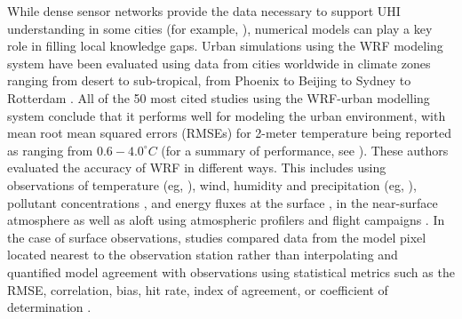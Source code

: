 \documentclass[draft,linenumbers]{agujournal}
\begin{document}
While dense sensor networks provide the data necessary to support UHI understanding in some cities (for example, \cite{scott2017intraurban,scott2017temperature,madisonUHI,minneapolisUHI,tokyoUHI}), numerical models can play a key role in filling local knowledge gaps. Urban simulations using the WRF modeling system \citep{chen2011integrated} have been evaluated using data from cities worldwide in climate zones ranging from desert to sub-tropical, from Phoenix \citep{georgescu2013summer} to Beijing \citep{wang2013modeling} to Sydney \citep{argueso2014temperature} to Rotterdam \citep{theeuwes2014seasonal}. All of the 50 most cited studies using the WRF-urban modelling system conclude that it performs well for modeling the urban environment, with mean root mean squared errors (RMSEs) for 2-meter temperature being reported as ranging from $0.6-4.0^\circ C$ (for a summary of performance, see \cite{kim2013evaluation}).
These authors evaluated the accuracy of WRF in different ways. This includes using observations of temperature (eg, \citet{kusaka2012numerical}), wind, humidity and precipitation (eg, \cite{miao2011impacts,chen2011numerical}), pollutant concentrations \citep{brioude2013top}, and energy fluxes at the surface \citep{yang2015enhancing,loridan2012multi}, in the near-surface atmosphere as well as aloft using atmospheric profilers and flight campaigns \citep{li2013development}. In the case of surface observations, studies compared data from the model pixel located nearest to the observation station rather than interpolating and quantified model agreement with observations using statistical metrics such as the RMSE, correlation, bias, hit rate, index of agreement, or coefficient of determination \citep{loridan2010trade,salamanca2011study,lee2011evaluation,chen2011numerical,chen2014wrf,li2013multi}.
\end{document}
